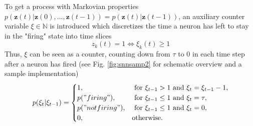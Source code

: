 To get a process with Markovian properties $p(\textbf{z}(t)| \textbf{z}(0), ..., \textbf{z}(t-1)) = p(\textbf{z}(t)| \textbf{z}(t-1)) $, an auxiliary counter variable $\xi \in \mathbb{N}$ is introduced which discretizes the time a neuron has left to stay in the "firing" state into time slices
\[
z_k(t) = 1 \iff \xi_k(t) \ge 1
\]
Thus, $\xi$ can be seen as a counter, counting down from $\tau$ to $0$ in each time step after a neuron has fired (see Fig. \ref{fig:snnsamp2} for schematic overview and a sample implementation)
\[
p(\xi_t | \xi_{t-1}) = 
\begin{cases}
	1, & \text{ for } \xi_{t-1} > 1 \text{ and } \xi_t = \xi_{t-1} -1 ,\\
	p("firing"), & \text{ for } \xi_{t-1} \le 1 \text{ and } \xi_t = \tau ,\\
	p("not firing"), & \text{ for } \xi_{t-1} \le 1 \text{ and } \xi_t = 0 ,\\
	0, & \text{otherwise}.
\end{cases}
\]


